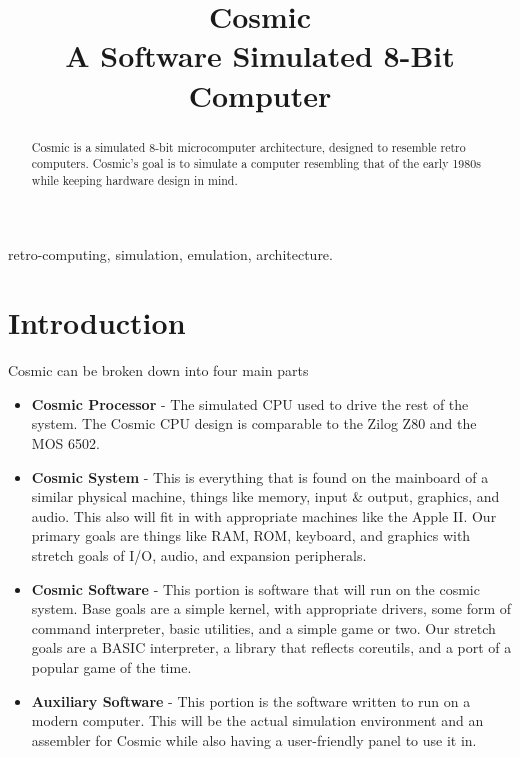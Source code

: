 \documentclass[conference]{IEEEtran}
\begin{document}
\title{
 Cosmic\\A Software Simulated 8-Bit Computer}

\author{
\and
{}

}

\maketitle

\begin{abstract}
Cosmic is a simulated 8-bit microcomputer architecture, designed to resemble retro computers. Cosmic's goal is to simulate a computer resembling that of the early 1980s while keeping hardware design in mind. 
\end{abstract}

\begin{IEEEkeywords}
retro-computing, simulation, emulation, architecture.
\end{IEEEkeywords}

\section{Introduction}
Cosmic can be broken down into four main parts
\begin{itemize}
    \item \textbf{Cosmic Processor} - The simulated CPU used to drive the rest of the system. The Cosmic CPU design is comparable to the Zilog Z80 and the MOS 6502. 
    \item \textbf{Cosmic System} - This is everything that is found on the mainboard of a similar physical machine, things like memory, input \& output, graphics, and audio. This also will fit in with appropriate machines like the Apple II. Our primary goals are things like RAM, ROM, keyboard, and graphics with stretch goals of I/O, audio, and expansion peripherals. 
    \item \textbf{Cosmic Software}  - This portion is software that will run on the cosmic system. Base goals are a simple kernel, with appropriate drivers, some form of command interpreter, basic utilities, and a simple game or two. Our stretch goals are a BASIC interpreter, a library that reflects coreutils, and a port of a popular game of the time. 
    \item \textbf{Auxiliary Software} - This portion is the software written to run on a modern computer. This will be the actual simulation environment and an assembler for Cosmic while also having a user-friendly panel to use it in.
\end{itemize}
\end{document}
